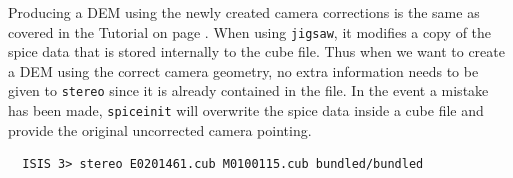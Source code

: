 Producing a DEM using the newly created camera corrections is the same
as covered in the Tutorial on page \pageref{ch:moc_tutorial}. When using
\texttt{jigsaw}, it modifies a copy of the spice data that is stored
internally to the cube file. Thus when we want to create a DEM using
the correct camera geometry, no extra information needs to be given to
\texttt{stereo} since it is already contained in the file. In the
event a mistake has been made, \texttt{spiceinit} will overwrite the
spice data inside a cube file and provide the original uncorrected
camera pointing.

\begin{verbatim}
  ISIS 3> stereo E0201461.cub M0100115.cub bundled/bundled
\end{verbatim}





